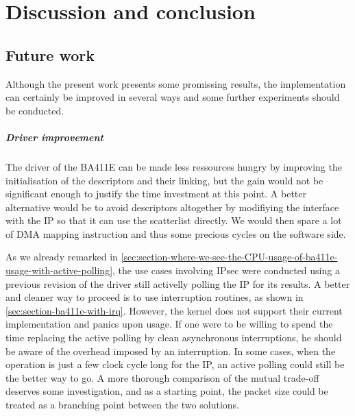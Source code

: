 \chapter{Discussion and conclusion}

\section{Future work}\label{sec:future-work}

Although the present work presents some promissing results, the implementation can certainly be improved in several ways and some further experiments should be conducted.

\paragraph{Driver improvement}
The driver of the BA411E can be made less ressources hungry by improving the initialisation of the descriptors and their linking, but the gain would not be significant enough to justify the time investment at this point.
A better alternative would be to avoid descriptors altogether by modifiying the interface with the IP so that it can use the scatterlist directly.
We would then spare a lot of DMA mapping instruction and thus some precious cycles on the software side.

As we already remarked in \ref{sec:section-where-we-see-the-CPU-usage-of-ba411e-usage-with-active-polling}, the use cases involving IPsec were conducted using a previous revision of the driver still activelly polling the IP for its results.
A better and cleaner way to proceed is to use interruption routines, as shown in \ref{sec:section-ba411e-with-irq}.
However, the kernel does not support their current implementation and panics upon usage.
If one were to be willing to spend the time replacing the active polling by clean asynchronous interruptions, he should be aware of the overhead imposed by an interruption.
In some cases, when the operation is just a few clock cycle long for the IP, an active polling could still be the better way to go.
A more thorough comparison of the mutual trade-off deserves some investigation, and as a starting point, the packet size could be treated as a branching point between the two solutions.


